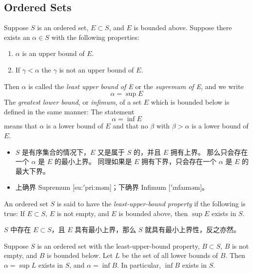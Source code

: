\documentclass[../poma-notes.tex]{subfiles}
\begin{document}
\subsection*{Ordered Sets}

\setcounter{poma}{6}
\begin{definition}
  Suppose $S$ is an ordered set, $E \subset S$, and $E$ is bounded above.
  Suppose there exists an $\alpha \in S$ with the following properties:
  \begin{enumerate}[label=(\roman*)]
    \item $\alpha$ is an upper bound of $E$.
    \item If $\gamma < \alpha$ the $\gamma$ is not an upper bound of $E$.
  \end{enumerate}

  Then $\alpha$ is called the \textit{least upper bound of E} or the \textit{supremum of E},
  and we write
  \[ \alpha = \sup E \]
  The \textit{greatest lower bound}, or \textit{infimum}, of a set $E$ which is bounded below
  is defined in the same manner: The statement \[ \alpha = \inf E \] means that $\alpha$ is
  a lower bound of $E$ and that no $\beta$ with $\beta > \alpha$ is a lower bound of $E$.
\end{definition}

\begin{anote}
  \begin{itemize}
    \item $S$ 是有序集合的情况下，$E$ 又是属于 $S$ 的，并且 $E$ 拥有上界。
          那么只会存在一个 $\alpha$ 是 $E$ 的最小上界。
          同理如果是 $E$ 拥有下界，只会存在一个 $\alpha$ 是 $E$ 的最大下界。
    \item 上确界 Supremum [su:$'$pri:məm]；下确界 Infimum [$'$\i nfa\i məm]。
  \end{itemize}
\end{anote}

\setcounter{poma}{9}
\begin{definition}
  An ordered set $S$ is said to have the \textit{least-upper-bound property} if the following
  is true: If $E \subset S$, $E$ is not empty, and $E$ is bounded above, then $\sup E$ exists in $S$.
\end{definition}

\begin{anote}
  $S$ 中存在 $E \subset S$，且 $E$ 具有最小上界，那么 $S$ 就具有最小上界性，反之亦然。
\end{anote}

\begin{theorem}
  Suppose $S$ is an ordered set with the least-upper-bound property,
  $B \subset S$, $B$ is not empty, and $B$ is bounded below.
  Let $L$ be the set of all lower bounds of $B$. Then $\alpha = \sup L$
  exists in $S$, and $\alpha = \inf B$.
  In particular, $\inf B$ exists in $S$.
\end{theorem}
\end{document}
